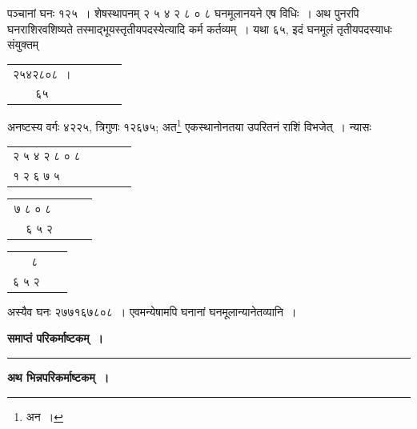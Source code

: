 \documentclass[10pt, openany]{book}
\begin{document}
{पञ्चानां घनः १२५~। शेषस्थापनम् २ ५ ४ २ ८ ० ८}
{घनमूलानयने एष विधिः~। अथ पुनरपि घनराशिरवशिष्यते
तस्माद्भूयस्तृतीयपदस्येत्यादि}
{कर्म कर्तव्यम्~। यथा ६५, इदं घनमूलं तृतीयपदस्याधः संयुक्तम्}  \begin{tabular}{cccll} २५४२८०८~।\\


६५ \end{tabular}
{अनष्टस्य वर्गः ४२२५, त्रिगुणः १२६७५; अत\renewcommand{\thefootnote}{\s ५}\footnote{\s अन~।} एकस्थानोनतया उपरितनं राशिं विभजेत्~।}
{न्यासः}\\

\centering\begin{tabular} {ccccc}२ ५ ४ २ ८ ० ८ \\
 १ २ ६ ७ ५ ~~~
\end{tabular}


\begin{center}
\begin{tabular} {clll} ७  ८  ० ८ \\
  ~\,~६ ५ २ \end{tabular}
\end{center}


\newpage


\centering\begin{tabular}{ccl}
 ~~~८ \\
 ६ ५ २ \end{tabular}

{अस्यैव घनः २७७१६७८०८~। एवमन्येषामपि घनानां घनमूलान्यानेतव्यानि~।}

\begin{center}
{\large \textbf{समाप्तं परिकर्माष्टकम्~।}}
\vspace{2mm}

\rule{0.1\linewidth}{0.5pt}
\vspace{4mm}
    
{\large \textbf{अथ भिन्नपरिकर्माष्टकम्~।}}\end{center}
\end{document}
